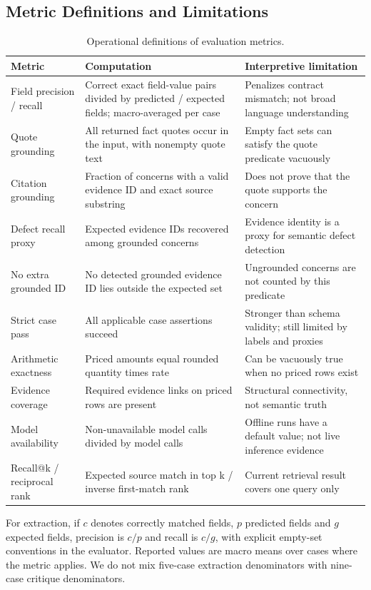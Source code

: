 \documentclass[11pt,a4paper]{article}
\begin{document}
\subsection{Metric Definitions and Limitations}
\begin{table}[H]\caption{Operational definitions of evaluation metrics.}\small
\begin{tabularx}{\linewidth}{p{.22\linewidth}XX}\toprule
Metric & Computation & Interpretive limitation \\\midrule
Field precision / recall & Correct exact field-value pairs divided by predicted / expected fields; macro-averaged per case & Penalizes contract mismatch; not broad language understanding \\
Quote grounding & All returned fact quotes occur in the input, with nonempty quote text & Empty fact sets can satisfy the quote predicate vacuously \\
Citation grounding & Fraction of concerns with a valid evidence ID and exact source substring & Does not prove that the quote supports the concern \\
Defect recall proxy & Expected evidence IDs recovered among grounded concerns & Evidence identity is a proxy for semantic defect detection \\
No extra grounded ID & No detected grounded evidence ID lies outside the expected set & Ungrounded concerns are not counted by this predicate \\
Strict case pass & All applicable case assertions succeed & Stronger than schema validity; still limited by labels and proxies \\
Arithmetic exactness & Priced amounts equal rounded quantity times rate & Can be vacuously true when no priced rows exist \\
Evidence coverage & Required evidence links on priced rows are present & Structural connectivity, not semantic truth \\
Model availability & Non-unavailable model calls divided by model calls & Offline runs have a default value; not live inference evidence \\
Recall@k / reciprocal rank & Expected source match in top k / inverse first-match rank & Current retrieval result covers one query only \\\bottomrule
\end{tabularx}\end{table}
For extraction, if $c$ denotes correctly matched fields, $p$ predicted fields and $g$ expected fields, precision is $c/p$ and recall is $c/g$, with explicit empty-set conventions in the evaluator. Reported values are macro means over cases where the metric applies. We do not mix five-case extraction denominators with nine-case critique denominators.
\end{document}
